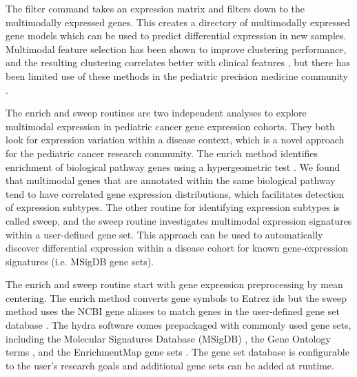 \documentclass[10pt,letterpaper]{article}
\begin{document}
The filter command takes an expression matrix and filters down to the multimodally expressed genes. This creates a directory of multimodally expressed gene models which can be used to predict differential expression in new samples. Multimodal feature selection has been shown to improve clustering performance, and the resulting clustering correlates better with clinical features \cite{yiliMultimodalityCriterionFeature2005}, but there has been limited use of these methods in the pediatric precision medicine community \cite{modyIntegrativeClinicalSequencing2015, worstNextgenerationPersonalisedMedicine2016, obergImplementationNextGeneration2016}. 

The enrich and sweep routines are two independent analyses to explore multimodal expression in pediatric cancer gene expression cohorts. They both look for expression variation within a disease context, which is a novel approach for the pediatric cancer research community. The enrich method identifies enrichment of biological pathway genes using a hypergeometric test \cite{yuClusterProfilerPackageComparing2012}. We found that multimodal genes that are annotated within the same biological pathway tend to have correlated gene expression distributions, which facilitates detection of expression subtypes. The other routine for identifying expression subtypes is called sweep, and the sweep routine investigates multimodal expression signatures within a user-defined gene set. This approach can be used to automatically discover differential expression within a disease cohort for known gene-expression signatures (i.e. MSigDB gene sets).

The enrich and sweep routine start with gene expression preprocessing by mean centering. The enrich method converts gene symbols to Entrez ids but the sweep method uses the NCBI gene aliases to match genes in the user-defined gene set database \cite{benson2012genbank}. The hydra software comes prepackaged with commonly used gene sets, including the Molecular Signatures Database (MSigDB) \cite{liberzonMolecularSignaturesDatabase2011}, the Gene Ontology terms \cite{ashburnerGeneOntologyTool2000, gene2018gene}, and the EnrichmentMap gene sets \cite{merico2010enrichment}. The gene set database is configurable to the user’s research goals and additional gene sets can be added at runtime.
\end{document}
